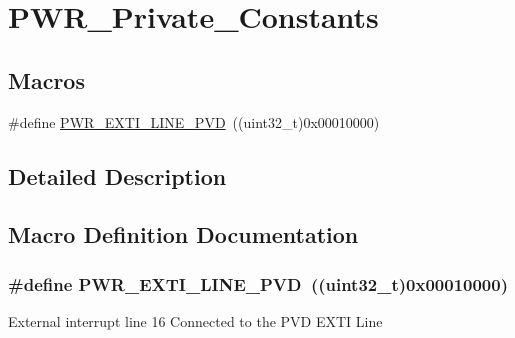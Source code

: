 \hypertarget{group___p_w_r___private___constants}{\section{P\-W\-R\-\_\-\-Private\-\_\-\-Constants}
\label{group___p_w_r___private___constants}
}
\subsection*{Macros}
\begin{DoxyCompactItemize}
\item 
\#define \hyperlink{group___p_w_r___private___constants_ga43a49255649e03d2d2b6b12c5c379d2b}{P\-W\-R\-\_\-\-E\-X\-T\-I\-\_\-\-L\-I\-N\-E\-\_\-\-P\-V\-D}~((uint32\-\_\-t)0x00010000)
\end{DoxyCompactItemize}


\subsection{Detailed Description}


\subsection{Macro Definition Documentation}
\hypertarget{group___p_w_r___private___constants_ga43a49255649e03d2d2b6b12c5c379d2b}{
\subsubsection[{P\-W\-R\-\_\-\-E\-X\-T\-I\-\_\-\-L\-I\-N\-E\-\_\-\-P\-V\-D}]{\setlength{\rightskip}{0pt plus 5cm}\#define P\-W\-R\-\_\-\-E\-X\-T\-I\-\_\-\-L\-I\-N\-E\-\_\-\-P\-V\-D~((uint32\-\_\-t)0x00010000)}}\label{group___p_w_r___private___constants_ga43a49255649e03d2d2b6b12c5c379d2b}
External interrupt line 16 Connected to the P\-V\-D E\-X\-T\-I Line 